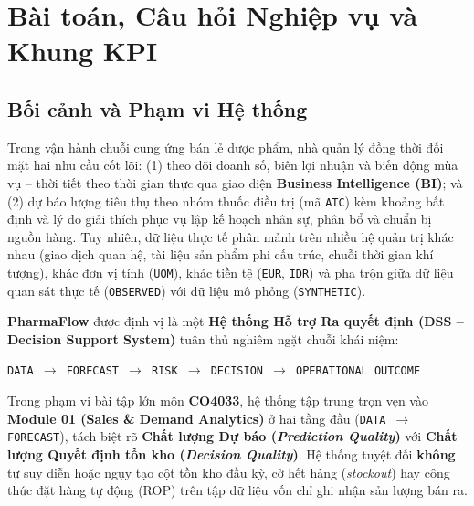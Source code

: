 \chapter{Bài toán, Câu hỏi Nghiệp vụ và Khung KPI}
\label{ch:baitoan_kpi}

\section{Bối cảnh và Phạm vi Hệ thống}
Trong vận hành chuỗi cung ứng bán lẻ dược phẩm, nhà quản lý đồng thời đối mặt hai nhu cầu cốt lõi: (1) theo dõi doanh số, biên lợi nhuận và biến động mùa vụ -- thời tiết theo thời gian thực qua giao diện \textbf{Business Intelligence (BI)}; và (2) dự báo lượng tiêu thụ theo nhóm thuốc điều trị (mã \texttt{ATC}) kèm khoảng bất định và lý do giải thích phục vụ lập kế hoạch nhân sự, phân bổ và chuẩn bị nguồn hàng. Tuy nhiên, dữ liệu thực tế phân mảnh trên nhiều hệ quản trị khác nhau (giao dịch quan hệ, tài liệu sản phẩm phi cấu trúc, chuỗi thời gian khí tượng), khác đơn vị tính (\texttt{UOM}), khác tiền tệ (\texttt{EUR}, \texttt{IDR}) và pha trộn giữa dữ liệu quan sát thực tế (\texttt{OBSERVED}) với dữ liệu mô phỏng (\texttt{SYNTHETIC}).

\textbf{PharmaFlow} được định vị là một \textbf{Hệ thống Hỗ trợ Ra quyết định (DSS -- Decision Support System)} tuân thủ nghiêm ngặt chuỗi khái niệm:
\begin{center}
\texttt{DATA $\rightarrow$ FORECAST $\rightarrow$ RISK $\rightarrow$ DECISION $\rightarrow$ OPERATIONAL OUTCOME}
\end{center}
Trong phạm vi bài tập lớn môn \textbf{CO4033}, hệ thống tập trung trọn vẹn vào \textbf{Module 01 (Sales \& Demand Analytics)} ở hai tầng đầu (\texttt{DATA $\rightarrow$ FORECAST}), tách biệt rõ \textbf{Chất lượng Dự báo (\textit{Prediction Quality})} với \textbf{Chất lượng Quyết định tồn kho (\textit{Decision Quality})}. Hệ thống tuyệt đối \textbf{không} tự suy diễn hoặc ngụy tạo cột tồn kho đầu kỳ, cờ hết hàng (\textit{stockout}) hay công thức đặt hàng tự động (ROP) trên tập dữ liệu vốn chỉ ghi nhận sản lượng bán ra.

